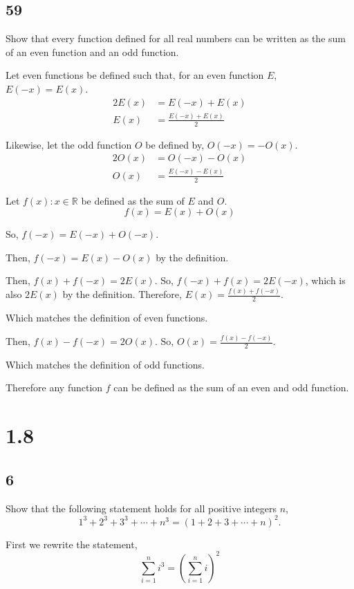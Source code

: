 \documentclass{article}
\begin{document}
\subsection*{59}

Show that every function defined for all real numbers can be written as the sum of an even function and an odd function.

Let even functions be defined such that, for an even function $E$, $E(-x) = E(x)$.
\begin{align*}
    2E(x) &= E(-x) + E(x) \\
    E(x) &= \frac{E(-x)+E(x)}{2}
\end{align*}

Likewise, let the odd function $O$ be defined by, $O(-x) = -O(x)$.
\begin{align*}
    2O(x) &= O(-x) - O(x) \\
    O(x) &= \frac{E(-x)-E(x)}{2}
\end{align*}

Let $f(x) : x \in \mathbb{R}$ be defined as the sum of $E$ and $O$. 
\[f(x) = E(x) + O(x)\]

So, $f(-x) = E(-x) + O(-x)$.

Then, $f(-x) = E(x) - O(x)$ by the definition.

Then, $f(x) + f(-x) = 2E(x)$. 
So, $f(-x) + f(x) = 2E(-x)$, which is also $2E(x)$ by the definition.
Therefore, $E(x) = \frac{f(x) + f(-x)}{2}$.

Which matches the definition of even functions.

Then, $f(x) - f(-x) = 2O(x)$.
So, $O(x) = \frac{f(x) - f(-x)}{2}$.

Which matches the definition of odd functions.

Therefore any function $f$ can be defined as the sum of an even and odd function.

\section*{1.8}

\subsection*{6}

Show that the following statement holds for all positive integers $n$,
\[1^3+2^3+3^3+\cdots+n^3 = {(1+2+3+\cdots+n)}^2.\] 

First we rewrite the statement, \[ \sum\limits_{i=1}^{n} i^3 = {\left( \sum\limits_{i=1}^{n} i \right)}^2 \]
\end{document}

